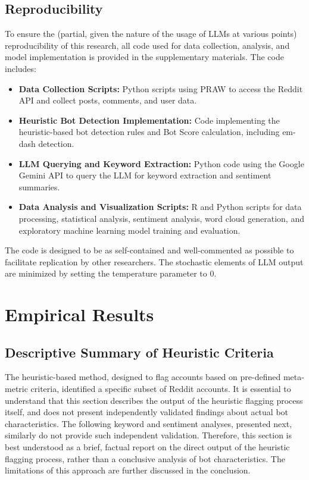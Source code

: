 \documentclass[
  12pt,
  letterpaper,
  DIV=11,
  numbers=noendperiod]{scrartcl}
\providecommand{\tightlist}{%
  \setlength{\itemsep}{0pt}\setlength{\parskip}{0pt}}\usepackage{longtable,booktabs,array}
\begin{document}
\subsection{Reproducibility}\label{reproducibility}

To ensure the (partial, given the nature of the usage of LLMs at various
points) reproducibility of this research, all code used for data
collection, analysis, and model implementation is provided in the
supplementary materials. The code includes:

\begin{itemize}
\tightlist
\item
  \textbf{Data Collection Scripts:} Python scripts using PRAW to access
  the Reddit API and collect posts, comments, and user data.
\item
  \textbf{Heuristic Bot Detection Implementation:} Code implementing the
  heuristic-based bot detection rules and Bot Score calculation,
  including em-dash detection.
\item
  \textbf{LLM Querying and Keyword Extraction:} Python code using the
  Google Gemini API to query the LLM for keyword extraction and
  sentiment summaries.
\item
  \textbf{Data Analysis and Visualization Scripts:} R and Python scripts
  for data processing, statistical analysis, sentiment analysis, word
  cloud generation, and exploratory machine learning model training and
  evaluation.
\end{itemize}

The code is designed to be as self-contained and well-commented as
possible to facilitate replication by other researchers. The stochastic
elements of LLM output are minimized by setting the temperature
parameter to 0.

\section{Empirical Results}\label{empirical-results}

\subsection{Descriptive Summary of Heuristic
Criteria}\label{descriptive-summary-of-heuristic-criteria}

The heuristic-based method, designed to flag accounts based on
pre-defined meta-metric criteria, identified a specific subset of Reddit
accounts. It is essential to understand that this section describes the
output of the heuristic flagging process itself, and does not present
independently validated findings about actual bot characteristics. The
following keyword and sentiment analyses, presented next, similarly do
not provide such independent validation. Therefore, this section is best
understood as a brief, factual report on the direct output of the
heuristic flagging process, rather than a conclusive analysis of bot
characteristics. The limitations of this approach are further discussed
in the conclusion.
\end{document}
